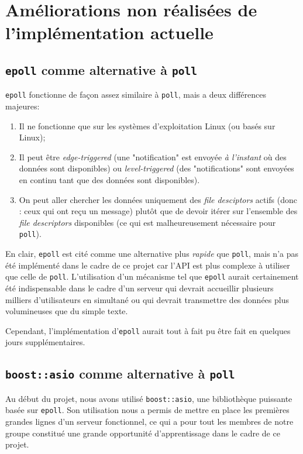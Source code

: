 \documentclass{article}
\begin{document}
\section{Améliorations non réalisées de l'implémentation actuelle}
\subsection{\texttt{epoll} comme alternative à \texttt{poll}}
\texttt{epoll} \cite{epoll} fonctionne de façon assez similaire à \texttt{poll}, mais a deux différences majeures:
\begin{enumerate}
    \item Il ne fonctionne que sur les systèmes d'exploitation Linux (ou basés sur Linux);
    \item Il peut être \textit{edge-triggered} (une "notification" est envoyée \textit{à l'instant} où des données sont disponibles) ou \textit{level-triggered} (des "notifications" sont envoyées en continu tant que des données sont disponibles). \cite{LevelEdgeTrigger}
    \item On peut aller chercher les données uniquement des \textit{file desciptors} actifs (donc : ceux qui ont reçu un message) plutôt que de devoir itérer sur l'ensemble des \textit{file descriptors} disponibles (ce qui est malheureusement nécessaire pour \texttt{poll}). \cite{EpollTrigger}
\end{enumerate}

\noindent En clair, \texttt{epoll} est cité comme une alternative plus \textit{rapide} que \texttt{poll}, mais n'a pas été implémenté dans le cadre de ce projet car l'API est plus complexe à utiliser que celle de \texttt{poll}. L'utilisation d'un mécanisme tel que \texttt{epoll} aurait certainement été indispensable dans le cadre d'un serveur qui devrait accueillir plusieurs milliers d'utilisateurs en simultané ou qui devrait transmettre des données plus volumineuses que du simple texte.

Cependant, l'implémentation d'\texttt{epoll} aurait tout à fait pu être fait en quelques jours supplémentaires.

\subsection{\texttt{boost::asio} comme alternative à \texttt{poll}}
Au début du projet, nous avons utilisé \texttt{boost::asio}, une bibliothèque puissante basée sur \texttt{epoll}. Son utilisation nous a permis de mettre en place les premières grandes lignes d'un serveur fonctionnel,  ce qui a pour tout les membres de notre groupe constitué une grande opportunité d’apprentissage dans le cadre de ce projet.
\end{document}
